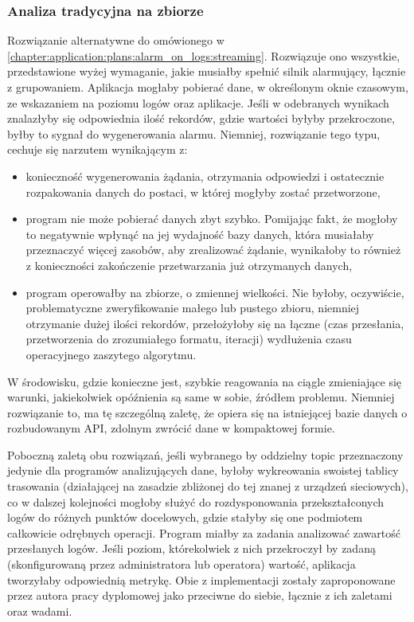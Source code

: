     \subsubsection{Analiza tradycyjna na zbiorze}
    \label{chapter:application:plans:alarm_on_logs:bulk}
    Rozwiązanie alternatywne do omówionego w \ref{chapter:application:plans:alarm_on_logs:streaming}. Rozwiązuje ono wszystkie, przedstawione
    wyżej wymaganie, jakie musiałby spełnić silnik alarmujący, łącznie z grupowaniem. Aplikacja mogłaby pobierać dane, w określonym oknie czasowym,
    ze wskazaniem na poziomu logów oraz aplikacje. Jeśli w odebranych wynikach znalazłyby się odpowiednia
    ilość rekordów, gdzie wartości byłyby przekroczone, byłby to sygnał do wygenerowania alarmu. Niemniej, rozwiązanie tego typu, cechuje się
    narzutem wynikającym z:
    \begin{itemize}
        \item konieczność wygenerowania żądania, otrzymania odpowiedzi i ostatecznie rozpakowania danych do postaci, w której mogłyby zostać
        przetworzone,
        \item program nie może pobierać danych zbyt szybko. Pomijając fakt, że mogłoby to negatywnie wpłynąć na jej wydajność bazy danych, która
        musiałaby przeznaczyć więcej zasobów, aby zrealizować żądanie, wynikałoby to również z konieczności zakończenie przetwarzania już
        otrzymanych danych,
        \item program operowałby na zbiorze, o zmiennej wielkości. Nie byłoby, oczywiście, problematyczne zweryfikowanie małego lub pustego zbioru,
        niemniej otrzymanie dużej ilości rekordów, przełożyłoby się na łączne (czas przesłania, przetworzenia do zrozumiałego formatu, iteracji)
        wydłużenia czasu operacyjnego zaszytego algorytmu. 
    \end{itemize}
    W środowisku, gdzie konieczne jest, szybkie reagowania na ciągle zmieniające się warunki, jakiekolwiek opóźnienia są same w sobie, źródłem
    problemu. Niemniej rozwiązanie to, ma tę szczególną zaletę, że opiera się na istniejącej bazie danych o rozbudowanym API, zdolnym
    zwrócić dane w kompaktowej formie.
    
    Poboczną zaletą obu rozwiązań, jeśli wybranego by oddzielny topic przeznaczony jedynie dla programów analizujących dane, byłoby wykreowania
    swoistej tablicy trasowania (działającej na zasadzie zbliżonej do tej znanej z urządzeń sieciowych), co w dalszej kolejności mogłoby
    służyć do rozdysponowania przekształconych logów do różnych punktów docelowych, gdzie stałyby się one podmiotem całkowicie odrębnych operacji.
    Program miałby za zadania analizować zawartość przesłanych logów. Jeśli poziom, którekolwiek z nich przekroczył by zadaną (skonfigurowaną przez
    administratora lub operatora) wartość, aplikacja tworzyłaby odpowiednią metrykę.
    Obie z implementacji zostały zaproponowane przez autora pracy dyplomowej jako przeciwne do siebie, łącznie z ich zaletami oraz wadami.

